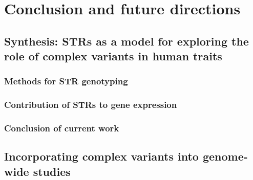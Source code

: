 \chapter{Conclusion and future directions}
\label{chap:conc}

\section{Synthesis: STRs as a model for exploring the role of complex variants in human traits}

\subsection{Methods for STR genotyping}

\subsection{Contribution of STRs to gene expression}

\subsection{Conclusion of current work}

\section{Incorporating complex variants into genome-wide studies}

